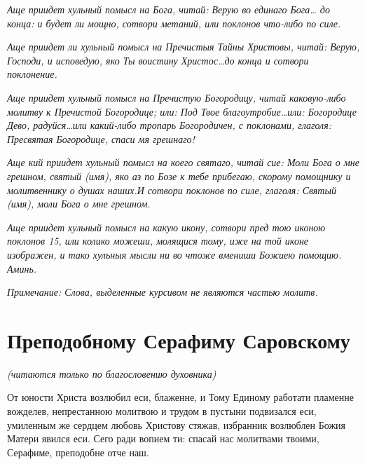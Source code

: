 \itshape Аще приидет хульный помысл на Бога, читай:\normalfont{} Верую во единаго Бога\itshape … до конца: и будет ли мощно, сотвори метаний, или поклонов что-либо по силе.\normalfont{}


\itshape Аще приидет ли хульный помысл на Пречистыя Тайны Христовы, читай:\normalfont{}  Верую, Господи, и исповедую, яко Ты воистину Христос…\itshape  до конца и сотвори поклонение.\normalfont{}


\itshape Аще приидет хульный помысл на Пречистую Богородицу, читай каковую-либо молитву к Пречистой Богородице; или:\normalfont{}  Под Твое благоутробие…\itshape  или:\normalfont{}  Богородице Дево, радуйся…\itshape  или какий-либо тропарь Богородичен, с поклонами, глаголя:\normalfont{} Пресвятая Богородице, спаси мя грешнаго!

\itshape Аще кий приидет хульный помысл на коего святаго, читай сие\normalfont{}: Моли Бога о мне грешном, святый (\itshape имя\normalfont{}), яко аз по Бозе к тебе прибегаю, скорому помощнику и молитвеннику о душах наших.\itshape  И сотвори поклонов по силе, глаголя:\normalfont{}  Святый (\itshape имя\normalfont{}), моли Бога о мне грешном.

\itshape Аще приидет хульный помысл на какую икону, сотвори пред тою иконою поклонов 15, или колико можеши, молящися тому, иже на той иконе изображен, и тако хульныя мысли ни во чтоже вмениши Божиею помощию. Аминь.\normalfont{}


\itshape Примечание: Слова, выделенные курсивом не являются частью молитв.\normalfont{}





\section{Преподобному  Серафиму Саровскому}
 


\itshape (читаются только по благословению духовника)

\normalfont{}



От юности Христа возлюбил еси, блаженне, и Тому Единому работати пламенне вожделев, непрестанною молитвою и трудом в пустыни подвизался еси, умиленным же сердцем любовь Христову стяжав, избранник возлюблен Божия Матери явился еси. Сего ради вопием ти: спасай нас молитвами твоими, Серафиме, преподобне отче наш. 

